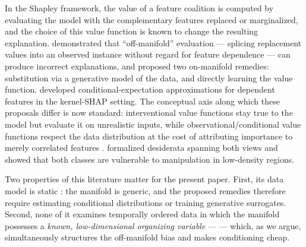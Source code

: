 \documentclass{article}
\begin{document}
In the Shapley framework, the value of a feature coalition is computed by evaluating the model with the complementary features replaced or marginalized, and the choice of this value function is known to change the resulting explanation. \citet{frye2021shapley} demonstrated that ``off-manifold'' evaluation --- splicing replacement values into an observed instance without regard for feature dependence --- can produce incorrect explanations, and proposed two on-manifold remedies: substitution via a generative model of the data, and directly learning the value function. \citet{aas2021explaining} developed conditional-expectation approximations for dependent features in the kernel-SHAP setting. The conceptual axis along which these proposals differ is now standard: interventional value functions stay true to the model but evaluate it on unrealistic inputs, while observational/conditional value functions respect the data distribution at the cost of attributing importance to merely correlated features \citep{chen2020true, janzing2020feature, sundararajan2020many}.  \citet{yeh2022threading} formalized desiderata spanning both views and showed that both classes are vulnerable to manipulation in low-density regions.

Two properties of this literature matter for the present paper. First, its data model is static : the manifold is generic, and the proposed remedies therefore require estimating conditional distributions or training generative surrogates. Second, none of it examines temporally ordered data in which the manifold possesses a \emph{known, low-dimensional organizing variable} ---  --- which, as we argue, simultaneously structures the off-manifold bias and makes conditioning cheap.


\subsection[What a background explains]{}\label{sec:related:background}
\end{document}

